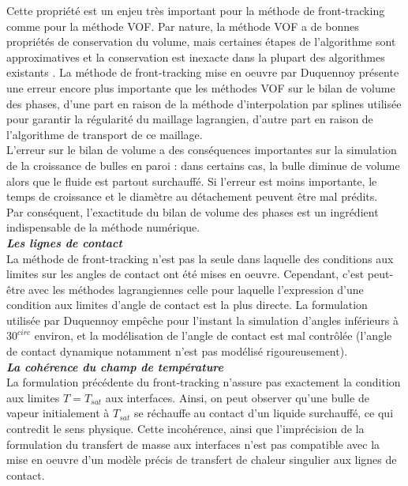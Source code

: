 Cette propri\'et\'e est un enjeu tr\`es important pour la m\'ethode de front-tracking comme pour la m\'ethode VOF. Par nature, la m\'ethode VOF a de bonnes propri\'et\'es de conservation du volume, mais certaines \'etapes de l'algorithme sont approximatives et la conservation est inexacte dans la plupart des algorithmes existants \cite{Aulisa2003}. La m\'ethode de front-tracking mise en oeuvre par Duquennoy pr\'esente une erreur encore plus importante que les m\'ethodes VOF sur le bilan de volume des phases, d'une part en raison de la m\'ethode d'interpolation par splines utilis\'ee pour garantir la r\'egularit\'e du maillage lagrangien, d'autre part en raison de l'algorithme de transport de ce maillage.\\
L'erreur sur le bilan de volume a des cons\'equences importantes sur la simulation de la croissance de bulles en paroi : dans certains cas, la bulle diminue de volume alors que le fluide est partout surchauff\'e. Si l'erreur est moins importante, le temps de croissance et le diam\`etre au d\'etachement peuvent \^etre mal pr\'edits.\\
Par cons\'equent, l'exactitude du bilan de volume des phases est un ingr\'edient indispensable de la m\'ethode num\'erique.\smallskip \\

\textit{\textbf{Les lignes de contact}}\smallskip \\

La m\'ethode de front-tracking \cite{Duquennoy2000} n'est pas la seule dans laquelle des conditions aux limites sur les angles de contact ont \'et\'e mises en oeuvre. Cependant, c'est peut-\^etre avec les m\'ethodes lagrangiennes
celle pour laquelle l'expression d'une condition aux limites d'angle de contact est la plus directe. La formulation utilis\'ee par Duquennoy emp\^eche pour l'instant la simulation d'angles inf\'erieurs \`a $30^{circ}$ environ, et la
mod\'elisation de l'angle de contact est mal contr\^ol\'ee (l'angle de contact dynamique notamment n'est pas mod\'elis\'e rigoureusement). \smallskip \\

\textit{\textbf{La coh\'erence du champ de temp\'erature}}\smallskip \\

La formulation pr\'ec\'edente du front-tracking n'assure pas exactement la
condition aux limites $T = T_{sat}$ aux interfaces. Ainsi, on peut observer qu'une
bulle de vapeur initialement \`a $T_{sat}$ se r\'echauffe au contact d'un liquide surchauff\'e, ce qui contredit le sens physique. Cette incoh\'erence, ainsi que l'impr\'ecision de la formulation du transfert de masse aux interfaces
n'est pas compatible avec la mise en oeuvre d'un mod\`ele pr\'ecis de transfert de chaleur singulier aux lignes de contact.


